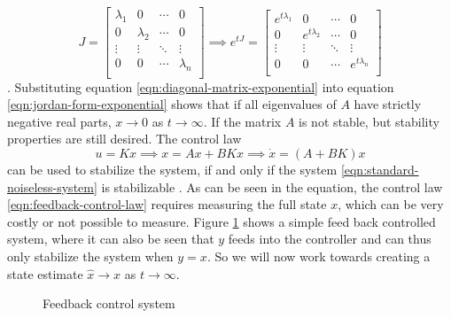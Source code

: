 \begin{equation}\label{eqn:diagonal-matrix-exponential}
    J =
    \begin{bmatrix}
        \lambda_1 & 0 & \cdots & 0 \\
        0 & \lambda_2 & \cdots & 0 \\
        \vdots & \vdots & \ddots & \vdots \\
        0 & 0 & \cdots & \lambda_n \\
    \end{bmatrix} \implies 
    e^{tJ} = 
    \begin{bmatrix}
        e^{t\lambda_1} & 0 & \cdots & 0 \\
        0 & e^{t\lambda_2} & \cdots & 0 \\
        \vdots & \vdots & \ddots & \vdots \\
        0 & 0 & \cdots & e^{t\lambda_n} \\
    \end{bmatrix}
\end{equation}
\cite[Section 7.1]{Hespanha2018LinearTheory}. Substituting equation \eqref{eqn:diagonal-matrix-exponential} into equation \eqref{eqn:jordan-form-exponential} shows that if all eigenvalues of $A$ have strictly negative real parts, $x \rightarrow 0$ as $t \rightarrow \infty$. If the matrix $A$ is not stable, but stability properties are still desired. The control law
\begin{equation}\label{eqn:feedback-control-law}
    u = Kx \implies x = Ax + BKx \implies \dot{x} = (A+BK)x
\end{equation}
can be used to stabilize the system, if and only if the system \eqref{eqn:standard-noiseless-system} is stabilizable \cite[Th. 14.5]{Hespanha2018LinearTheory}. As can be seen in the equation, the control law \eqref{eqn:feedback-control-law} requires measuring the full state $x$, which can be very costly or not possible to measure. Figure \ref{fig:feedback-diagram} shows a simple feed back controlled system, where it can also be seen that $y$ feeds into the controller and can thus only stabilize the system when $y=x$. So we will now work towards creating a state estimate $\hat{x} \rightarrow x$ as $t \rightarrow \infty$.

\begin{figure}[ht]
    \centering
    \caption{Feedback control system}
    \label{fig:feedback-diagram}
\end{figure}
 
